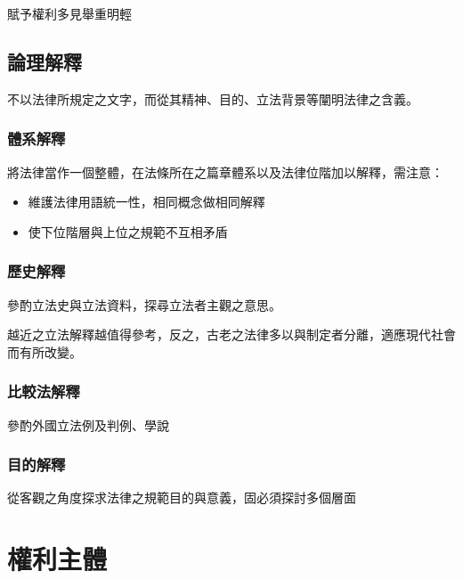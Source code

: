 \documentclass[
]{book}
\begin{document}
賦予權利多見舉重明輕

\hypertarget{ux8ad6ux7406ux89e3ux91cb}{%
\section{論理解釋}\label{ux8ad6ux7406ux89e3ux91cb}}

不以法律所規定之文字，而從其精神、目的、立法背景等闡明法律之含義。

\hypertarget{ux9ad4ux7cfbux89e3ux91cb}{%
\subsection{體系解釋}\label{ux9ad4ux7cfbux89e3ux91cb}}

將法律當作一個整體，在法條所在之篇章體系以及法律位階加以解釋，需注意：

\begin{itemize}
\item
  維護法律用語統一性，相同概念做相同解釋
\item
  使下位階層與上位之規範不互相矛盾
\end{itemize}

\hypertarget{ux6b77ux53f2ux89e3ux91cb}{%
\subsection{歷史解釋}\label{ux6b77ux53f2ux89e3ux91cb}}

參酌立法史與立法資料，探尋立法者主觀之意思。

越近之立法解釋越值得參考，反之，古老之法律多以與制定者分離，適應現代社會而有所改變。

\hypertarget{ux6bd4ux8f03ux6cd5ux89e3ux91cb}{%
\subsection{比較法解釋}\label{ux6bd4ux8f03ux6cd5ux89e3ux91cb}}

參酌外國立法例及判例、學說

\hypertarget{ux76eeux7684ux89e3ux91cb}{%
\subsection{目的解釋}\label{ux76eeux7684ux89e3ux91cb}}

從客觀之角度探求法律之規範目的與意義，固必須探討多個層面

\hypertarget{ux6b0aux5229ux4e3bux9ad4}{%
\chapter{權利主體}\label{ux6b0aux5229ux4e3bux9ad4}}
\end{document}
